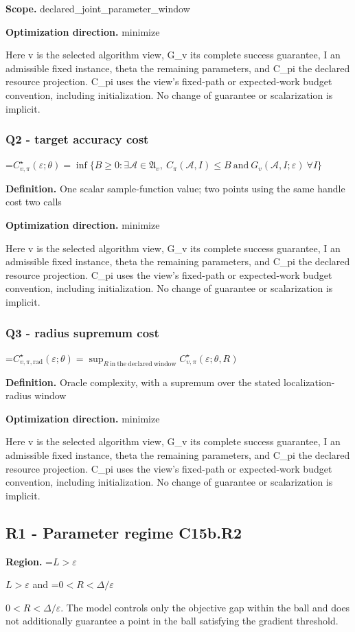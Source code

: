 \documentclass[10pt,a4paper]{article}
\newcommand{\AtlasMath}[1]{\par\begingroup\centering\setbox0=\hbox{$\displaystyle #1$}\ifdim\wd0>1.4\linewidth\typeout{ATLAS WIDE FORMULA: \the\wd0}\fi\ifdim\wd0>\linewidth\resizebox{\linewidth}{!}{\box0}\else\box0\fi\par\endgroup}
\newcommand{\AtlasInlineMath}[1]{\begingroup\setbox0=\hbox{$#1$}\ifdim\wd0>.4\linewidth\endgroup\AtlasMath{#1}\else\endgroup$#1$\fi}
\begin{document}
\textbf{Scope.} declared\_joint\_parameter\_window

\textbf{Optimization direction.} minimize

Here v is the selected algorithm view, G\_v its complete success guarantee, I an admissible fixed instance, theta the remaining parameters, and C\_pi the declared resource projection. C\_pi uses the view's fixed-path or expected-work budget convention, including initialization. No change of guarantee or scalarization is implicit.

\subsubsection{Q2 - target accuracy cost}
\AtlasMath{C^\star_{v,\pi}(\varepsilon;\theta)=\inf\{B\ge0:\exists\mathcal A\in\mathfrak A_v,\ C_\pi(\mathcal A,I)\le B\ \text{and}\ G_v(\mathcal A,I;\varepsilon)\ \forall I\}}
\textbf{Definition.} One scalar sample-function value; two points using the same handle cost two calls

\textbf{Optimization direction.} minimize

Here v is the selected algorithm view, G\_v its complete success guarantee, I an admissible fixed instance, theta the remaining parameters, and C\_pi the declared resource projection. C\_pi uses the view's fixed-path or expected-work budget convention, including initialization. No change of guarantee or scalarization is implicit.

\subsubsection{Q3 - radius supremum cost}
\AtlasMath{C^\star_{v,\pi,\mathrm{rad}}(\varepsilon;\theta)=\sup_{R\ \mathrm{in\ the\ declared\ window}}C^\star_{v,\pi}(\varepsilon;\theta,R)}
\textbf{Definition.} Oracle complexity, with a supremum over the stated localization-radius window

\textbf{Optimization direction.} minimize

Here v is the selected algorithm view, G\_v its complete success guarantee, I an admissible fixed instance, theta the remaining parameters, and C\_pi the declared resource projection. C\_pi uses the view's fixed-path or expected-work budget convention, including initialization. No change of guarantee or scalarization is implicit.

\subsection{R1 - Parameter regime C15b.R2}
\textbf{Region.} \AtlasInlineMath{L>\varepsilon} and \AtlasInlineMath{0<R<\Delta/\varepsilon}. The model controls only the objective gap within the ball and does not additionally guarantee a point in the ball satisfying the gradient threshold.
\end{document}
